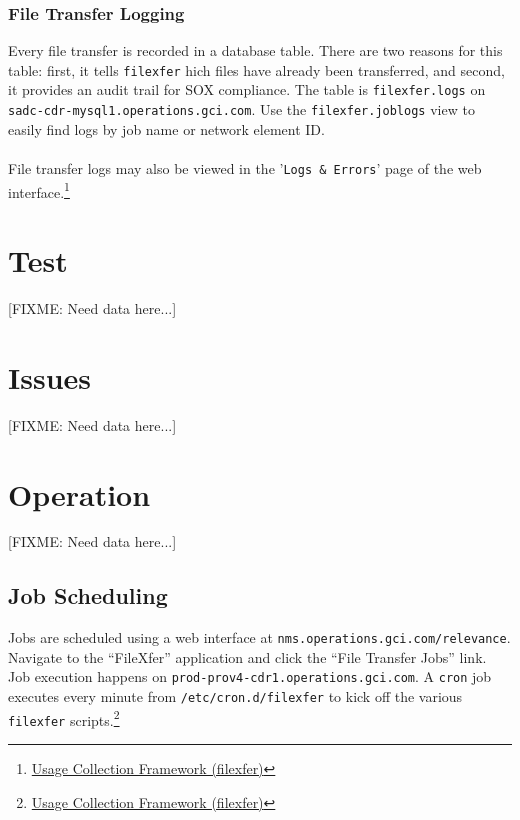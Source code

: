 \documentclass[12pt,letterpaper,dvips]{article}
\newcommand{\FIXME}[1]{\textsf{[FIXME: #1]}}
\begin{document}
\subsubsection{File Transfer Logging}
Every file transfer is recorded in a database table. There are
two reasons for this table: first, it tells \texttt{filexfer}
hich files have already been transferred, and second, it
provides an audit trail for SOX compliance. The table is
\texttt{filexfer.logs} on
\texttt{sadc-cdr-mysql1.operations.gci.com}. Use the
\texttt{filexfer.joblogs} view to easily find logs by job name
or network element ID.\\
\\
File transfer logs may also be viewed in the
'\texttt{Logs \& Errors}' page of the web interface.\footnote{\href{http://oss-wiki.operations.gci.com/dev/index.php/Usage_Collection\_Framework\_(filexfer)}{Usage Collection Framework (filexfer)}}


\section{Test}
\FIXME{Need data here...}


\section{Issues}
\FIXME{Need data here...}


\section{Operation}
\FIXME{Need data here...}


\subsection{Job Scheduling}
Jobs are scheduled using a web interface at
\texttt{nms.operations.gci.com/relevance}.  Navigate to the
``FileXfer'' application and click the ``File Transfer Jobs'' link.
Job execution happens on \texttt{prod-prov4-cdr1.operations.gci.com}.
A \texttt{cron} job executes every minute from
\texttt{/etc/cron.d/filexfer} to kick off the various \texttt{filexfer}
scripts.\footnote{\href{http://oss-wiki.operations.gci.com/dev/index.php/Usage\_Collection\_Framework\_(filexfer)}{Usage
    Collection Framework (filexfer)}}
\end{document}
